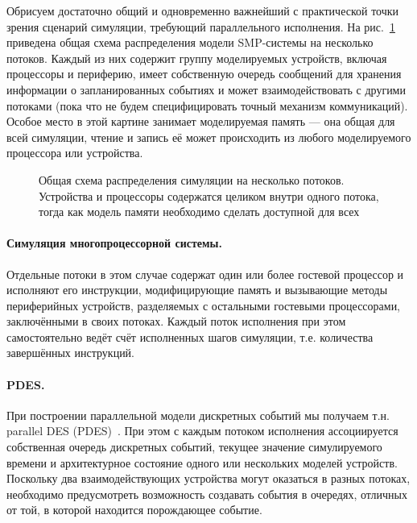 Обрисуем достаточно общий и одновременно важнейший с практической точки зрения сценарий симуляции, требующий параллельного исполнения. На рис.~\ref{fig:parsim-overview} приведена общая схема распределения модели SMP-системы на несколько потоков. Каждый из них содержит группу моделируемых устройств, включая процессоры и периферию, имеет собственную очередь сообщений для хранения информации о запланированных событиях и может взаимодействовать с другими потоками (пока что не будем специфицировать точный механизм коммуникаций). Особое место в этой картине занимает моделируемая память — она общая для всей симуляции, чтение и запись её может происходить из любого моделируемого процессора или устройства.

\begin{figure}[htbp]
    \centering
    \caption[Общая схема распределения симуляции на несколько потоков]{Общая схема распределения симуляции на несколько потоков. Устройства и процессоры содержатся целиком внутри одного потока, тогда как модель памяти необходимо сделать доступной для всех}
    \label{fig:parsim-overview}
\end{figure}

\paragraph{Симуляция многопроцессорной системы.} Отдельные потоки в этом случае содержат один или более гостевой процессор и исполняют его инструкции, модифицирующие память и вызывающие методы периферийных устройств, разделяемых с остальными гостевыми процессорами, заключёнными в своих потоках. Каждый поток исполнения при этом самостоятельно ведёт счёт исполненных шагов симуляции, т.е. количества завершённых инструкций.

\paragraph{PDES.} При построении параллельной модели дискретных событий мы получаем т.н. parallel DES (PDES)~\cite{fujimoto-parallel-dist-sim, Fujimoto-pdes, Liu09paralleldiscrete-event, ferscha-1995-pdes}. При этом с каждым потоком исполнения ассоциируется собственная очередь дискретных событий, текущее значение симулируемого времени и архитектурное состояние одного или нескольких моделей устройств. Поскольку два взаимодействующих устройства могут оказаться в разных потоках, необходимо предусмотреть возможность создавать события в очередях, отличных от той, в которой находится порождающее событие.


